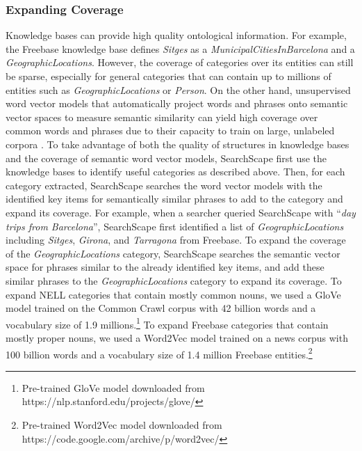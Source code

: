 \subsubsection{Expanding Coverage}

Knowledge bases can provide high quality ontological information. For example, the Freebase knowledge base defines \emph{Sitges} as a \emph{MunicipalCitiesInBarcelona} and a \emph{GeographicLocations}. However, the coverage of categories over its entities can still be sparse, especially for general categories that can contain up to millions of entities such as \emph{GeographicLocations} or \emph{Person}.
On the other hand, unsupervised word vector models that automatically project words and phrases onto semantic vector spaces to measure semantic similarity can yield high coverage over common words and phrases due to their capacity to train on large, unlabeled corpora \cite{mikolov2013efficient,pennington2014glove}.
To take advantage of both the quality of structures in knowledge bases and the coverage of semantic word vector models, SearchScape first use the knowledge bases to identify useful categories as described above. Then, for each category extracted, SearchScape searches the word vector models with the identified key items for semantically similar phrases to add to the category and expand its coverage. 
For example, when a searcher queried SearchScape with ``\emph{day trips from Barcelona}'', SearchScape first identified a list of \emph{GeographicLocations} including \emph{Sitges}, \emph{Girona}, and \emph{Tarragona} from Freebase. To expand the coverage of the \emph{GeographicLocations} category, SearchScape searches the semantic vector space for phrases similar to the already identified key items, and add these similar phrases to the \emph{GeographicLocations} category to expand its coverage. To expand NELL categories that contain mostly common nouns, we used a GloVe model trained on the Common Crawl corpus with 42 billion words and a vocabulary size of 1.9 millions.\footnote{Pre-trained GloVe model downloaded from https://nlp.stanford.edu/projects/glove/} To expand Freebase categories that contain mostly proper nouns, we used a Word2Vec model trained on a news corpus with 100 billion words and a vocabulary size of 1.4 million Freebase entities.\footnote{Pre-trained Word2Vec model downloaded from https://code.google.com/archive/p/word2vec/}

